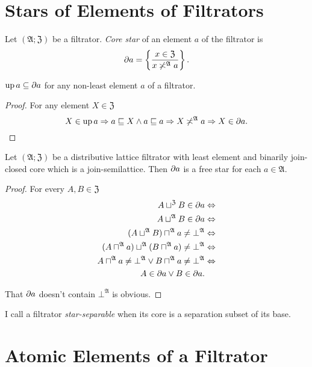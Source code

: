 \section{Stars of Elements of Filtrators}
\begin{defn}
Let $(\mathfrak{A};\mathfrak{Z})$
be a filtrator. \emph{Core star} of an element $a$ of the filtrator
is
\[
\partial a=\left\{ \frac{x\in\mathfrak{Z}}{x\not\asymp^{\mathfrak{A}}a}\right\}.
\]
\end{defn}
\begin{prop}
$\operatorname{up} a\subseteq\partial a$ for any non-least element $a$ of a filtrator.\end{prop}
\begin{proof}
For any element $X\in\mathfrak{Z}$
\[
X\in\operatorname{up} a\Rightarrow a\sqsubseteq X\land a\sqsubseteq a\Rightarrow X\not\asymp^{\mathfrak{A}}a\Rightarrow X\in\partial a.
\]
\end{proof}
\begin{thm}
\label{part-is-free}Let $(\mathfrak{A};\mathfrak{Z})$ be a distributive
lattice filtrator with least element and binarily join-closed core
which is a join-semilattice. Then $\partial a$ is a free star for
each $a\in\mathfrak{A}$.\end{thm}
\begin{proof}
For every $A,B\in\mathfrak{Z}$
\begin{align*}
A\sqcup^{\mathfrak{Z}}B\in\partial a & \Leftrightarrow\\
A\sqcup^{\mathfrak{A}}B\in\partial a & \Leftrightarrow\\
(A\sqcup^{\mathfrak{A}}B)\sqcap^{\mathfrak{A}}a\ne\bot^{\mathfrak{A}} & \Leftrightarrow\\
(A\sqcap^{\mathfrak{A}}a)\sqcup^{\mathfrak{A}}(B\sqcap^{\mathfrak{A}}a)\ne\bot^{\mathfrak{A}} & \Leftrightarrow\\
A\sqcap^{\mathfrak{A}}a\ne\bot^{\mathfrak{A}}\lor B\sqcap^{\mathfrak{A}}a\ne\bot^{\mathfrak{A}} & \Leftrightarrow\\
A\in\partial a\lor B\in\partial a.
\end{align*}


That $\partial a$ doesn't contain $\bot^{\mathfrak{A}}$ is obvious.\end{proof}
\begin{defn}
I call a filtrator \emph{star-separable}
when its core is a separation subset of its base.
\end{defn}

\section{Atomic Elements of a Filtrator}

